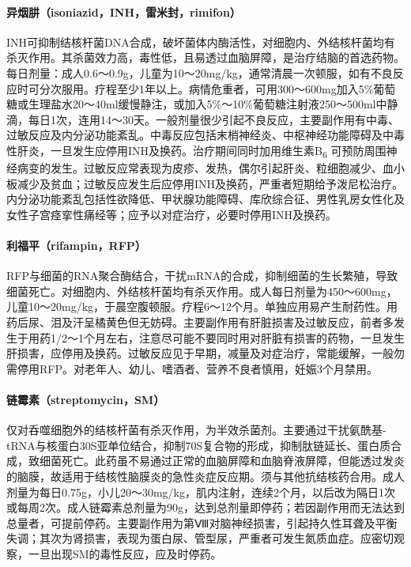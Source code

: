 \paragraph{异烟肼（isoniazid，INH，雷米封，rimifon）}

INH可抑制结核杆菌DNA合成，破坏菌体内酶活性，对细胞内、外结核杆菌均有杀灭作用。其杀菌效力高，毒性低，且易透过血脑屏障，是治疗结脑的首选药物。每日剂量：成人0.6～0.9g，儿童为10～20mg/kg，通常清晨一次顿服，如有不良反应时可分次服用。疗程至少1年以上。病情危重者，可用300～600mg加入5\%葡萄糖或生理盐水20～40ml缓慢静注，或加入5\%～10\%葡萄糖注射液250～500ml中静滴，每日1次，连用14～30天。一般剂量很少引起不良反应，主要副作用有中毒、过敏反应及内分泌功能紊乱。中毒反应包括末梢神经炎、中枢神经功能障碍及中毒性肝炎，一旦发生应停用INH及换药。治疗期间同时加用维生素B\textsubscript{6}
可预防周围神经病变的发生。过敏反应常表现为皮疹、发热，偶尔引起肝炎、粒细胞减少、血小板减少及贫血；过敏反应发生后应停用INH及换药，严重者短期给予泼尼松治疗。内分泌功能紊乱包括性欲降低、甲状腺功能障碍、库欣综合征、男性乳房女性化及女性子宫痉挛性痛经等；应予以对症治疗，必要时停用INH及换药。

\paragraph{利福平（rifampin，RFP）}

RFP与细菌的RNA聚合酶结合，干扰mRNA的合成，抑制细菌的生长繁殖，导致细菌死亡。对细胞内、外结核杆菌均有杀灭作用。成人每日剂量为450～600mg，儿童10～20mg/kg，于晨空腹顿服。疗程6～12个月。单独应用易产生耐药性。用药后尿、泪及汗呈橘黄色但无妨碍。主要副作用有肝脏损害及过敏反应，前者多发生于用药1/2～1个月左右，注意尽可能不要同时用对肝脏有损害的药物，一旦发生肝损害，应停用及换药。过敏反应见于早期，减量及对症治疗，常能缓解，一般勿需停用RFP。对老年人、幼儿、嗜酒者、营养不良者慎用，妊娠3个月禁用。

\paragraph{链霉素（streptomycin，SM）}

仅对呑噬细胞外的结核杆菌有杀灭作用，为半效杀菌剂。主要通过干扰氨酰基-tRNA与核蛋白30S亚单位结合，抑制70S复合物的形成，抑制肽链延长、蛋白质合成，致细菌死亡。此药虽不易通过正常的血脑屏障和血脑脊液屏障，但能透过发炎的脑膜，故适用于结核性脑膜炎的急性炎症反应期。须与其他抗结核药合用。成人剂量为每日0.75g，小儿20～30mg/kg，肌内注射，连续2个月，以后改为隔日1次或每周2次。成人链霉素总剂量为90g，达到总剂量即停药；若因副作用而无法达到总量者，可提前停药。主要副作用为第Ⅷ对脑神经损害，引起持久性耳聋及平衡失调；其次为肾损害，表现为蛋白尿、管型尿，严重者可发生氮质血症。应密切观察，一旦出现SM的毒性反应，应及时停药。

